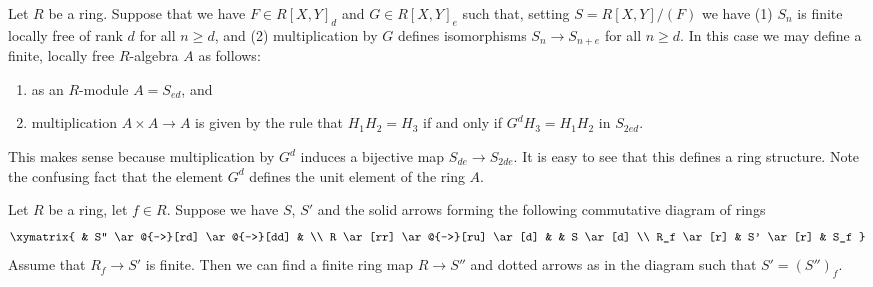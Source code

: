 \begin{remark}
\label{remark-algebra}
Let $R$ be a ring. Suppose that we have $F \in R[X, Y]_d$
and $G \in R[X, Y]_e$ such that, setting $S = R[X, Y]/(F)$
we have (1) $S_n$ is finite locally free of rank $d$ for
all $n \geq d$, and (2) multiplication by $G$ defines
isomorphisms $S_n \to S_{n + e}$ for all $n \geq d$. In this
case we may define a finite, locally free $R$-algebra
$A$ as follows:
\begin{enumerate}
\item as an $R$-module $A = S_{ed}$, and
\item multiplication $A \times A \to A$ is given by
the rule that $H_1 H_2 = H_3$ if and only if $G^d H_3 = H_1 H_2$
in $S_{2ed}$.
\end{enumerate}
This makes sense because multiplication by $G^d$
induces a bijective map $S_{de} \to S_{2de}$.
It is easy to see that this defines a ring structure.
Note the confusing fact that the element $G^d$
defines the unit element of the ring $A$.
\end{remark}

\begin{lemma}
\label{lemma-finite-after-localization}
Let $R$ be a ring, let $f \in R$.
Suppose we have $S$, $S'$ and the solid arrows
forming the following commutative diagram of rings
$$
\xymatrix{
& S'' \ar@{-->}[rd] \ar@{-->}[dd] &
\\
R \ar[rr] \ar@{-->}[ru] \ar[d] &  & S \ar[d]
\\
R_f \ar[r] & S' \ar[r] & S_f
}
$$
Assume that $R_f \to S'$ is finite. Then we can find
a finite ring map $R \to S''$ and dotted arrows as
in the diagram such that $S' = (S'')_f$.
\end{lemma}

